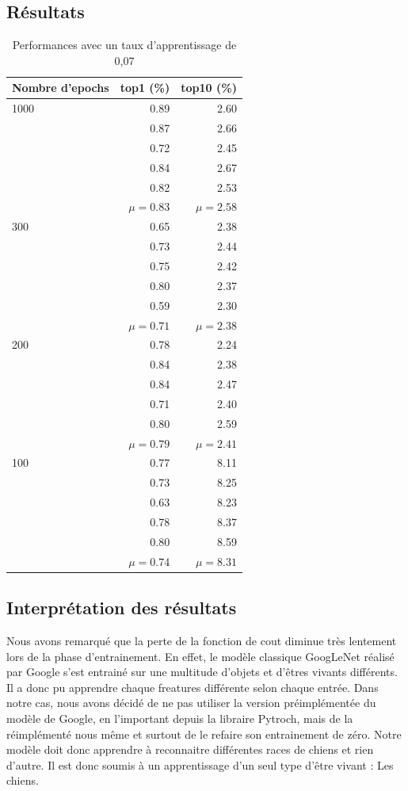 \documentclass{article}
\begin{document}
\subsection{Résultats}

\begin{table}[htbp]
\centering
\begin{tabular}{lrr}  
\toprule
Nombre d'epochs  & top1 (\%) & top10 (\%) \\
\midrule
1000 & 0.89 & 2.60 \\
         & 0.87 & 2.66 \\
         & 0.72 & 2.45 \\
         & 0.84 & 2.67 \\
         & 0.82 & 2.53 \\
         & $\mu = 0.83$ &  $\mu = 2.58$ \\
300   & 0.65 & 2.38 \\
         & 0.73 & 2.44 \\
         & 0.75 & 2.42 \\
         & 0.80 & 2.37 \\
         & 0.59 & 2.30 \\
         & $\mu = 0.71$ &  $\mu = 2.38$ \\
200   & 0.78 & 2.24 \\
         & 0.84 & 2.38 \\
         & 0.84 & 2.47 \\
         & 0.71 & 2.40 \\
         & 0.80 & 2.59 \\
         & $\mu = 0.79$ &  $\mu = 2.41$ \\
100   & 0.77 & 8.11 \\
         & 0.73 & 8.25 \\
         & 0.63 & 8.23 \\
         & 0.78 & 8.37 \\
         & 0.80 & 8.59 \\
         & $\mu = 0.74$ &  $\mu = 8.31$ \\
\bottomrule
\end{tabular}
\caption{Performances avec un taux d'apprentissage de 0,07}
\label{tab:booktabs}
\end{table}

\subsection{Interprétation des résultats}
Nous avons remarqué que la perte de la fonction de cout diminue très lentement
lors de la phase d’entrainement. En effet, le modèle classique GoogLeNet réalisé
par Google s’est entrainé sur une multitude d’objets et d'êtres vivants
différents. Il a donc pu apprendre chaque freatures différente selon chaque
entrée. Dans notre cas, nous avons décidé de ne pas utiliser la version
préimplémentée du modèle de Google, en l’important depuis la libraire Pytroch,
mais de la réimplémenté nous même et surtout de le refaire son entrainement de
zéro. Notre modèle doit donc apprendre à reconnaitre différentes races de chiens
et rien d’autre. Il est donc soumis à un apprentissage d’un seul type d’être
vivant : Les chiens.
\end{document}
